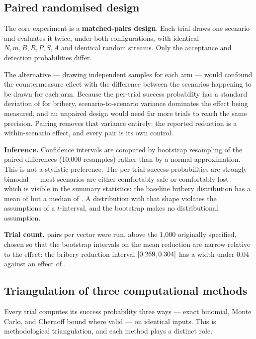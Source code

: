 \subsection{Paired randomised design}
\label{sec:method-paired}

The core experiment is a \textbf{matched-pairs design}. Each trial
draws one scenario and evaluates it twice, under both configurations,
with identical $N, m, B, R, P, S, A$ and identical random streams. Only
the acceptance and detection probabilities differ.

The alternative --- drawing independent samples for each arm --- would
confound the countermeasure effect with the difference between the
scenarios happening to be drawn for each arm. Because the per-trial
success probability has a standard deviation of \BriberyBaselineStd{}
for bribery, scenario-to-scenario variance dominates the effect being
measured, and an unpaired design would need far more trials to reach
the same precision. Pairing removes that variance entirely: the
reported reduction is a within-scenario effect, and every pair is its
own control.

\textbf{Inference.} Confidence intervals are computed by bootstrap
resampling of the paired differences (10{,}000 resamples) rather than
by a normal approximation. This is not a stylistic preference. The
per-trial success probabilities are strongly bimodal --- most scenarios
are either comfortably safe or comfortably lost --- which is visible in
the summary statistics: the baseline bribery distribution has a mean of
\BriberyBaseline{} but a median of \BriberyBaselineMedian. A
distribution with that shape violates the assumptions of a
$t$-interval, and the bootstrap makes no distributional assumption.

\textbf{Trial count.} \TotalTrials{} pairs per vector were run, above
the 1{,}000 originally specified, chosen so that the bootstrap
intervals on the mean reduction are narrow relative to the effect: the
bribery reduction interval $[0.269, 0.304]$ has a
width under 0.04 against an effect of \BriberyAbsReduction.

\subsection{Triangulation of three computational methods}
\label{sec:method-triangulation}

Every trial computes its success probability three ways --- exact
binomial, Monte Carlo, and Chernoff bound where valid --- on identical
inputs. This is methodological triangulation, and each method plays a
distinct role.


